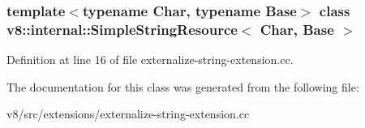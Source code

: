 \subsubsection*{template$<$typename Char, typename Base$>$\newline
class v8\+::internal\+::\+Simple\+String\+Resource$<$ Char, Base $>$}



Definition at line 16 of file externalize-\/string-\/extension.\+cc.



The documentation for this class was generated from the following file\+:\begin{DoxyCompactItemize}
\item 
v8/src/extensions/externalize-\/string-\/extension.\+cc\end{DoxyCompactItemize}
